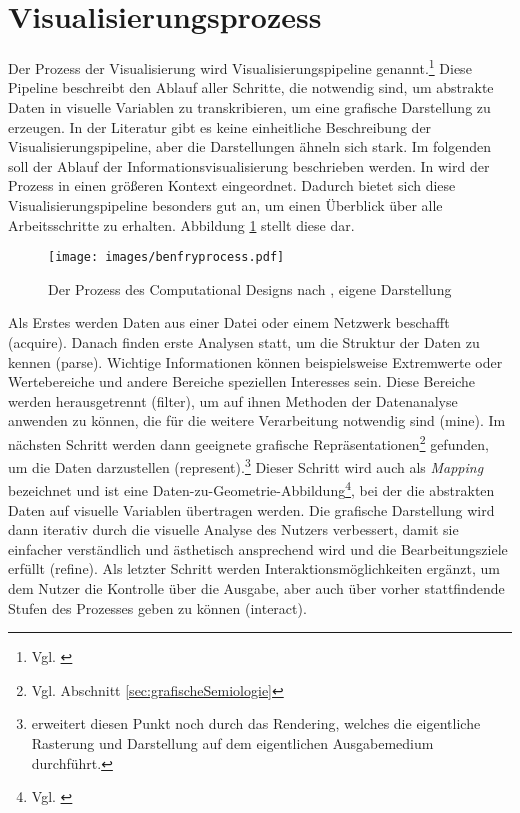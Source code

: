 \documentclass[a4paper, 12pt, DIV=calc, version=first, pdftex, headsepline, footsepline, bibtotocnumbered, liststotocnumbered]{scrreprt}
\begin{document}
\section{Visualisierungsprozess}
\label{sec:Pipeline}
Der Prozess der Visualisierung wird Visualisierungspipeline genannt.\footnote{Vgl. \citep[S.\,15]{Schumann}}
Diese Pipeline beschreibt den Ablauf aller
Schritte, die notwendig sind, um abstrakte Daten in visuelle Variablen
zu transkribieren, um eine grafische Darstellung zu erzeugen. In der Literatur gibt es keine einheitliche
Beschreibung der Visualisierungspipeline, aber die Darstellungen ähneln sich stark.
Im folgenden soll der Ablauf der Informationsvisualisierung
beschrieben werden. In \citep{BenFry} wird der Prozess in einen
größeren Kontext eingeordnet. Dadurch bietet sich diese
Visualisierungspipeline besonders gut an, um einen Überblick über alle Arbeitsschritte zu erhalten. Abbildung \ref{fig:benfryprocess}
stellt diese dar.
\begin{figure}
\centering
\texttt{[image: images/benfryprocess.pdf]}
\caption{Der Prozess des Computational Designs nach \citep[S.\,13]{BenFry}, eigene Darstellung}
\label{fig:benfryprocess}
\end{figure}
Als Erstes werden Daten aus einer Datei oder einem Netzwerk
beschafft (acquire). Danach finden erste Analysen statt, um die Struktur der Daten zu kennen (parse).
Wichtige Informationen können beispielsweise Extremwerte oder Wertebereiche und andere Bereiche speziellen
Interesses sein.
Diese Bereiche werden herausgetrennt (filter), um auf ihnen Methoden der Datenanalyse anwenden zu können,
die für die weitere Verarbeitung notwendig sind (mine). Im nächsten Schritt werden dann geeignete
grafische Repräsentationen\footnote{Vgl. Abschnitt \ref{sec:grafischeSemiologie}} gefunden, um die Daten
darzustellen (represent).\footnote{\citep{Schumann} erweitert diesen Punkt noch durch das Rendering, welches die eigentliche Rasterung
und Darstellung auf dem eigentlichen Ausgabemedium durchführt.}
Dieser Schritt wird auch als \textit{Mapping} bezeichnet und ist eine
Daten-zu-Geometrie-Abbildung\footnote{Vgl. \citep[S.\,16]{Schumann}}, bei der
die abstrakten Daten auf visuelle Variablen übertragen werden.
Die grafische Darstellung wird dann iterativ durch die visuelle Analyse des Nutzers
verbessert, damit sie einfacher verständlich und ästhetisch ansprechend wird und die Bearbeitungsziele erfüllt (refine). Als letzter
Schritt werden Interaktionsmöglichkeiten ergänzt, um dem Nutzer die Kontrolle über die
Ausgabe, aber auch über vorher stattfindende Stufen des Prozesses geben zu können (interact).
\end{document}
